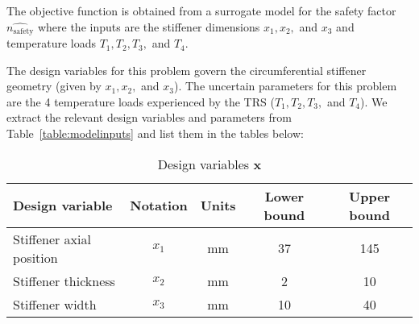 The objective function is obtained from a surrogate model for the safety factor $\hat{n_{\textrm{safety}}}$ where the inputs are the stiffener dimensions $x_1,x_2,$ and $x_3$ and temperature loads $T_1,T_2,T_3,$ and $T_4$.

The design variables for this problem govern the circumferential stiffener geometry (given by $x_1,x_2,$ and $x_3$). The uncertain parameters for this problem are the 4 temperature loads experienced by the \ac{TRS} ($T_1,T_2,T_3,$ and $T_4$). We extract the relevant design variables and parameters from Table~\ref{table:modelinputs} and list them in the tables below:


\begin{table}[h!]
    \centering
    \renewcommand{\arraystretch}{1.0}%
    \small\addtolength{\tabcolsep}{-2pt}
    \caption{Design variables ${\textbf{x}}$}
    \label{table:STOmodelinputs}
    \begin{tabular}{lcccc}
    \hline\hline
    \bf Design variable & \bf Notation & \bf Units & \bf Lower bound & \bf Upper bound \\
    \hline
    Stiffener axial position & $x_1$ & mm & 37 & 145 \\
    Stiffener thickness  & $x_2$ & mm & 2 & 10 \\
    Stiffener width & $x_3$ & mm & 10 & 40  \\
    \hline\hline
    \end{tabular}
\end{table}

